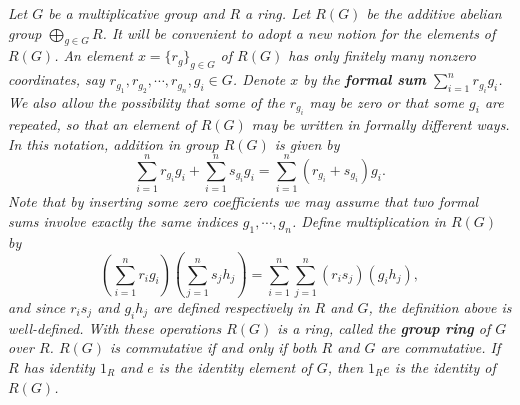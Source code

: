 \begin{example}\em
Let $G$ be a multiplicative group and $R$ a ring. Let $R(G)$ be the additive abelian group $\bigoplus_{g\in G}R$. It will be convenient to adopt a new notion for the elements of $R(G)$. An element $x=\{r_g\}_{g\in G}$ of $R(G)$ has only finitely many nonzero coordinates, say $r_{g_1},r_{g_2},\cdots,r_{g_n},g_i\in G$. Denote $x$ by the \textbf{formal sum} $\sum_{i=1}^nr_{g_i}g_i$. We also allow the possibility that some of the $r_{g_i}$ may be zero or that some $g_i$ are repeated, so that an element of $R(G)$ may be written in formally different ways. In this notation, addition in group $R(G)$ is given by 
$$
\sum_{i=1}^n{r_{g_i}g_i}+\sum_{i=1}^n{s_{g_i}g_i}=\sum_{i=1}^n{\left( r_{g_i}+s_{g_i} \right) g_i}.
$$
Note that by inserting some zero coefficients we may assume that two formal sums involve exactly the same indices $g_1,\cdots,g_n$. Define multiplication in $R(G)$ by 
$$
\left( \sum_{i=1}^n{r_ig_i} \right) \left( \sum_{j=1}^n{s_jh_j} \right) =\sum_{i=1}^n{\sum_{j=1}^n{\left( r_is_j \right) \left( g_ih_j \right)}},
$$
and since $r_is_j$ and $g_ih_j$ are defined respectively in $R$ and $G$, the definition above is well-defined. With these operations $R(G)$ is a ring, called the \textbf{group ring} of $G$ over $R$. $R(G)$ is commutative if and only if both $R$ and $G$ are commutative. If $R$ has identity $1_R$ and $e$ is the identity element of $G$, then $1_Re$ is the identity of $R(G)$.
\end{example}
